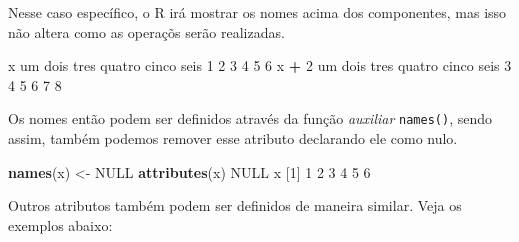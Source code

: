 \documentclass[10pt,a4paper]{book}
\newenvironment{Shaded}{\begin{snugshade}}{\end{snugshade}}
\newcommand{\KeywordTok}[1]{\textcolor[rgb]{0.13,0.29,0.53}{\textbf{#1}}}
\newcommand{\DecValTok}[1]{\textcolor[rgb]{0.00,0.00,0.81}{#1}}
\newcommand{\StringTok}[1]{\textcolor[rgb]{0.31,0.60,0.02}{#1}}
\newcommand{\OtherTok}[1]{\textcolor[rgb]{0.56,0.35,0.01}{#1}}
\newcommand{\OperatorTok}[1]{\textcolor[rgb]{0.81,0.36,0.00}{\textbf{#1}}}
\newcommand{\NormalTok}[1]{#1}
\begin{document}
Nesse caso específico, o R irá mostrar os nomes acima dos componentes,
mas isso não altera como as operaçõs serão realizadas.

\begin{Shaded}
\begin{Highlighting}[]
\NormalTok{x}
\NormalTok{    um   dois   tres quatro  cinco   seis }
     \DecValTok{1}      \DecValTok{2}      \DecValTok{3}      \DecValTok{4}      \DecValTok{5}      \DecValTok{6} 
\NormalTok{x }\OperatorTok{+}\StringTok{ }\DecValTok{2}
\NormalTok{    um   dois   tres quatro  cinco   seis }
     \DecValTok{3}      \DecValTok{4}      \DecValTok{5}      \DecValTok{6}      \DecValTok{7}      \DecValTok{8} 
\end{Highlighting}
\end{Shaded}

Os nomes então podem ser definidos através da função \emph{auxiliar}
\texttt{names()}, sendo assim, também podemos remover esse atributo
declarando ele como nulo.

\begin{Shaded}
\begin{Highlighting}[]
\KeywordTok{names}\NormalTok{(x) <-}\StringTok{ }\OtherTok{NULL}
\KeywordTok{attributes}\NormalTok{(x)}
\OtherTok{NULL}
\NormalTok{x}
\NormalTok{[}\DecValTok{1}\NormalTok{] }\DecValTok{1} \DecValTok{2} \DecValTok{3} \DecValTok{4} \DecValTok{5} \DecValTok{6}
\end{Highlighting}
\end{Shaded}

Outros atributos também podem ser definidos de maneira similar. Veja os
exemplos abaixo:

\begin{Shaded}
\end{Shaded}
\end{document}
